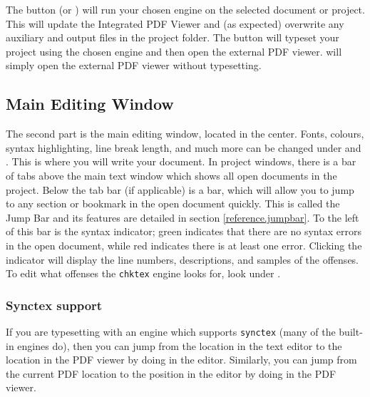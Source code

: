The  button (or ) will run your chosen engine on the selected document or project. This will update the Integrated PDF Viewer and (as expected) overwrite any auxiliary and output files in the project folder. The  button will typeset your project using the chosen engine and then open the external PDF viewer.  will simply open the external PDF viewer without typesetting.

\subsection{Main Editing Window}

The second part is the main editing window, located in the center. Fonts, colours, syntax highlighting, line break length, and much more can be changed under  and . This is where you will write your document. In project windows, there is a bar of tabs above the main text window which shows all open documents in the project. Below the tab bar (if applicable) is a  bar, which will allow you to jump to any section or bookmark in the open document quickly. This is called the Jump Bar and its features are detailed in section \ref{reference.jumpbar}. To the left of this bar is the syntax indicator; green indicates that there are no syntax errors in the open document, while red indicates there is at least one error. Clicking the indicator will display the line numbers, descriptions, and samples of the offenses. To edit what offenses the \verb|chktex| engine looks for, look under .

\subsubsection{Synctex support}

If you are typesetting with an engine which supports \texttt{synctex} (many of the built-in engines do), then you can jump from the location in the text editor to the location in the PDF viewer by doing  in the editor. Similarly, you can jump from the current PDF location to the position in the editor by doing  in the PDF viewer.

